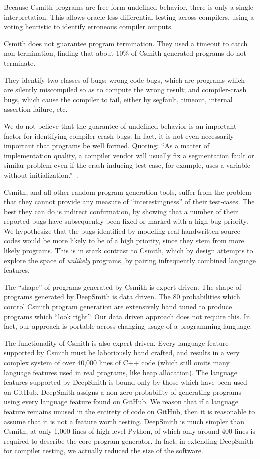 Because Csmith programs are free form undefined behavior, there is only a single interpretation. This allows oracle-less differential testing across compilers, using a voting heuristic to identify erroneous compiler outputs.

Csmith does not guarantee program termination. They used a timeout to catch non-termination, finding that about 10\% of Csmith generated programs do not terminate.

They identify two classes of bugs: wrong-code bugs, which are programs which are silently miscompiled so as to compute the wrong result; and compiler-crash bugs, which cause the compiler to fail, either by segfault, timeout, internal assertion failure, etc.

We do not believe that the guarantee of undefined behavior is an important factor for identifying compiler-crash bugs. In fact, it is not even necessarily important that programs be well formed. Quoting: ``As a matter of implementation quality, a compiler vendor will usually fix a segmentation fault or similar problem even if the crash-inducing test-case, for example, uses a variable without initialization.''~\cite{Regehr2012a}.

Csmith, and all other random program generation tools, suffer from the problem that they cannot provide any measure of ``interestingness'' of their test-cases. The best they can do is indirect confirmation, by showing that a number of their reported bugs have subsequently been fixed or marked with a high bug priority. We hypothesize that the bugs identified by modeling real handwritten source codes would be more likely to be of a high priority, since they stem from more likely programs. This is in stark contrast to Csmith, which by design attempts to explore the space of \emph{unlikely} programs, by pairing infrequently combined language features.

The ``shape'' of programs generated by Csmith is expert driven. The shape of programs generated by DeepSmith is data driven. The 80 probabilities which control Csmith program generation are extensively hand tuned to produce programs which ``look right''. Our data driven approach does not require this. In fact, our approach is portable across changing usage of a programming language.

The functionality of Csmith is also expert driven. Every language feature supported by Csmith must be laboriously hand crafted, and results in a very complex system of over 40,000 lines of C++ code (which still omits many language features used in real programs, like heap allocation). The language features supported by DeepSmith is bound only by those which have been used on GitHub. DeepSmith assigns a non-zero probability of generating programs using every language feature found on GitHub. We reason that if a language feature remains unused in the entirety of code on GitHub, then it is reasonable to assume that it is not a feature worth testing. DeepSmith is much simpler than Csmith, at only 1,000 lines of high level Python, of which only around 400 lines is required to describe the core program generator. In fact, in extending DeepSmith for compiler testing, we actually reduced the size of the software.

